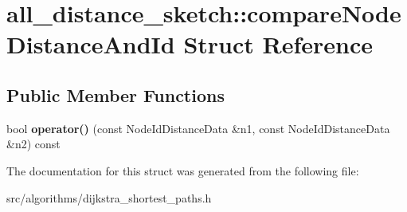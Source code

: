 \hypertarget{structall__distance__sketch_1_1compareNodeDistanceAndId}{}\section{all\+\_\+distance\+\_\+sketch\+:\+:compare\+Node\+Distance\+And\+Id Struct Reference}
\label{structall__distance__sketch_1_1compareNodeDistanceAndId}
\subsection*{Public Member Functions}
\begin{DoxyCompactItemize}
\item 
\hypertarget{structall__distance__sketch_1_1compareNodeDistanceAndId_abf432909ac74914e7c8344fe20bbd445}{}bool {\bfseries operator()} (const Node\+Id\+Distance\+Data \&n1, const Node\+Id\+Distance\+Data \&n2) const \label{structall__distance__sketch_1_1compareNodeDistanceAndId_abf432909ac74914e7c8344fe20bbd445}

\end{DoxyCompactItemize}


The documentation for this struct was generated from the following file\+:\begin{DoxyCompactItemize}
\item 
src/algorithms/dijkstra\+\_\+shortest\+\_\+paths.\+h\end{DoxyCompactItemize}
